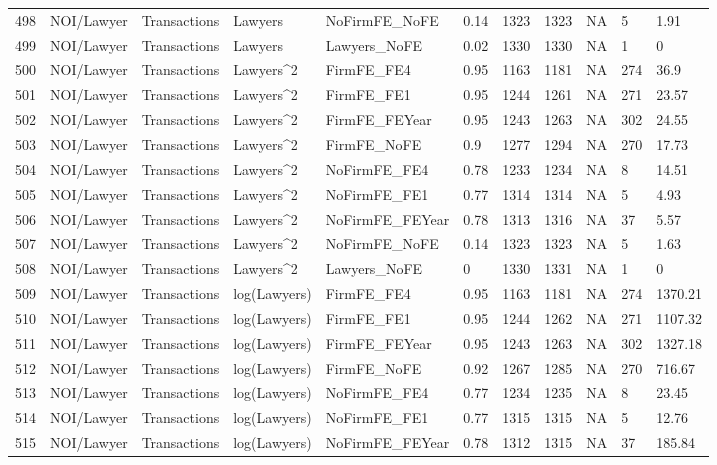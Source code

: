 \documentclass{article}
\begin{document}
\begin{table}[H]
\begin{tabular}{rllllllllll}
  498 & NOI/Lawyer & Transactions & Lawyers & NoFirmFE\_NoFE & 0.14 & 1323 & 1323 & NA & 5 & 1.91 \\ 
  499 & NOI/Lawyer & Transactions & Lawyers & Lawyers\_NoFE & 0.02 & 1330 & 1330 & NA & 1 & 0 \\ 
  500 & NOI/Lawyer & Transactions & Lawyers^2 & FirmFE\_FE4 & 0.95 & 1163 & 1181 & NA & 274 & 36.9 \\ 
  501 & NOI/Lawyer & Transactions & Lawyers^2 & FirmFE\_FE1 & 0.95 & 1244 & 1261 & NA & 271 & 23.57 \\ 
  502 & NOI/Lawyer & Transactions & Lawyers^2 & FirmFE\_FEYear & 0.95 & 1243 & 1263 & NA & 302 & 24.55 \\ 
  503 & NOI/Lawyer & Transactions & Lawyers^2 & FirmFE\_NoFE & 0.9 & 1277 & 1294 & NA & 270 & 17.73 \\ 
  504 & NOI/Lawyer & Transactions & Lawyers^2 & NoFirmFE\_FE4 & 0.78 & 1233 & 1234 & NA & 8 & 14.51 \\ 
  505 & NOI/Lawyer & Transactions & Lawyers^2 & NoFirmFE\_FE1 & 0.77 & 1314 & 1314 & NA & 5 & 4.93 \\ 
  506 & NOI/Lawyer & Transactions & Lawyers^2 & NoFirmFE\_FEYear & 0.78 & 1313 & 1316 & NA & 37 & 5.57 \\ 
  507 & NOI/Lawyer & Transactions & Lawyers^2 & NoFirmFE\_NoFE & 0.14 & 1323 & 1323 & NA & 5 & 1.63 \\ 
  508 & NOI/Lawyer & Transactions & Lawyers^2 & Lawyers\_NoFE & 0 & 1330 & 1331 & NA & 1 & 0 \\ 
  509 & NOI/Lawyer & Transactions & log(Lawyers) & FirmFE\_FE4 & 0.95 & 1163 & 1181 & NA & 274 & 1370.21 \\ 
  510 & NOI/Lawyer & Transactions & log(Lawyers) & FirmFE\_FE1 & 0.95 & 1244 & 1262 & NA & 271 & 1107.32 \\ 
  511 & NOI/Lawyer & Transactions & log(Lawyers) & FirmFE\_FEYear & 0.95 & 1243 & 1263 & NA & 302 & 1327.18 \\ 
  512 & NOI/Lawyer & Transactions & log(Lawyers) & FirmFE\_NoFE & 0.92 & 1267 & 1285 & NA & 270 & 716.67 \\ 
  513 & NOI/Lawyer & Transactions & log(Lawyers) & NoFirmFE\_FE4 & 0.77 & 1234 & 1235 & NA & 8 & 23.45 \\ 
  514 & NOI/Lawyer & Transactions & log(Lawyers) & NoFirmFE\_FE1 & 0.77 & 1315 & 1315 & NA & 5 & 12.76 \\ 
  515 & NOI/Lawyer & Transactions & log(Lawyers) & NoFirmFE\_FEYear & 0.78 & 1312 & 1315 & NA & 37 & 185.84 \\ 

\end{tabular}
\end{table}
\end{document}
